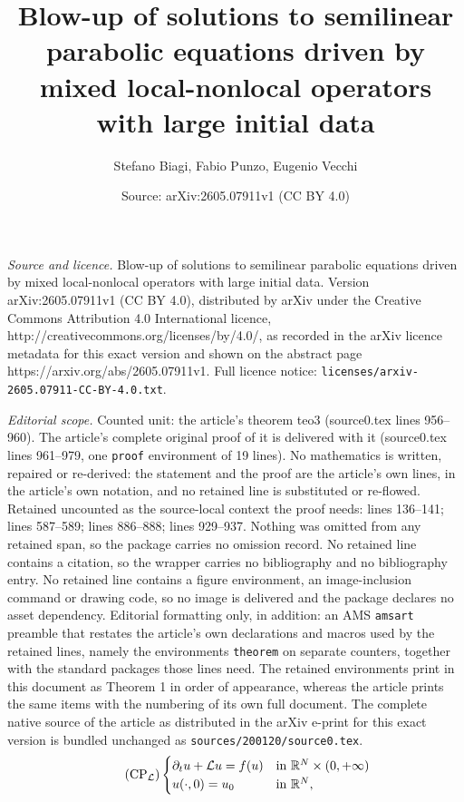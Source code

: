 \documentclass[10pt,a4paper]{amsart}
\title{Blow-up of solutions to semilinear parabolic equations driven by mixed local-nonlocal operators with large initial data}
\author{Stefano Biagi, Fabio Punzo, Eugenio Vecchi}
\date{Source: arXiv:2605.07911v1 (CC BY 4.0)}
\def \LL {\mathcal{L}}
\begin{document}
\maketitle

\noindent\emph{Source and licence.} Blow-up of solutions to semilinear parabolic equations driven by mixed local-nonlocal operators with large initial data. Version arXiv:2605.07911v1 (CC BY 4.0), distributed by arXiv under the Creative Commons Attribution 4.0 International licence, http://creativecommons.org/licenses/by/4.0/, as recorded in the arXiv licence metadata for this exact version and shown on the abstract page https://arxiv.org/abs/2605.07911v1. Full licence notice: \texttt{licenses/arxiv-2605.07911-CC-BY-4.0.txt}.\par\smallskip

\noindent\textit{Editorial scope.} Counted unit: the article's theorem teo3 (source0.tex lines 956--960). The article's complete original proof of it is delivered with it (source0.tex lines 961--979, one \texttt{proof} environment of 19 lines). No mathematics is written, repaired or re-derived: the statement and the proof are the article's own lines, in the article's own notation, and no retained line is substituted or re-flowed.  Retained uncounted as the source-local context the proof needs: lines 136--141; lines 587--589; lines 886--888; lines 929--937.  Nothing was omitted from any retained span, so the package carries no omission record.  No retained line contains a citation, so the wrapper carries no bibliography and no bibliography entry.  No retained line contains a figure environment, an image-inclusion command or drawing code, so no image is delivered and the package declares no asset dependency.  Editorial formatting only, in addition: an AMS \texttt{amsart} preamble that restates the article's own declarations and macros used by the retained lines, namely the environments \texttt{theorem} on separate counters, together with the standard packages those lines need.  The retained environments print in this document as Theorem 1 in order of appearance, whereas the article prints the same items with the numbering of its own full document.  The complete native source of the article as distributed in the arXiv e-print for this exact version is bundled unchanged as \texttt{sources/200120/source0.tex}.
\begin{equation}\tag{$\mathrm{CP}_{\LL}$}\label{eq:mainPbParabolicIntro}
	\begin{cases}
	\partial_t u+\mathcal{L}	u = f(u) & \text{in $\mathbb{R}^N\times(0,+\infty)$} \\
	u(\cdot,0) = u_0 & \text{in $\mathbb{R}^N$},
	\end{cases}
\end{equation}
\end{document}
